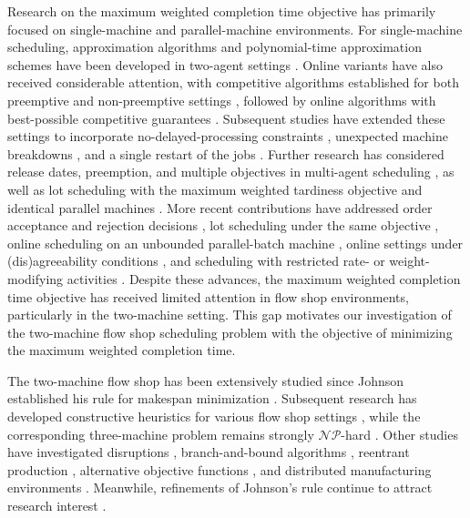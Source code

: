 \documentclass[12pt]{article} \textheight=24.5cm \textwidth=16.5cm \parskip = 0.165cm
\begin{document}
\begin{sloppypar}
        Research on the maximum weighted completion time objective has primarily focused on single-machine and parallel-machine environments.
        For single-machine scheduling, approximation algorithms and polynomial-time approximation schemes have been developed in two-agent settings \citep{NongChengNg2011EJOR}.
        Online variants have also received considerable attention, with competitive algorithms established for both preemptive and non-preemptive settings \citep{Li-Wenjie2015APJOR}, followed by online algorithms with best-possible competitive guarantees \citep{ChaiLuLi2018APJOR}.
        Subsequent studies have extended these settings to incorporate no-delayed-processing constraints \citep{LiLiu2023OptimLett}, unexpected machine breakdowns \citep{GuoChenMao2024APJOR}, and a single restart of the jobs \citep{LiangLuSun2024AIMSMath}.
        Further research has considered release dates, preemption, and multiple objectives in multi-agent scheduling \citep{YuanNgCheng2020EJOR}, as well as lot scheduling with the maximum weighted tardiness objective \citep{MosheiovSarig2023JOCO} and identical parallel machines \citep{Sun2024JOCO}.
        More recent contributions have addressed order acceptance and rejection decisions \citep{LuZuoZhangOu20254OR}, lot scheduling under the same objective \citep{ZhengLiLiu2025JOCO}, online scheduling on an unbounded parallel-batch machine \citep{ZhangLuYuan2025JOCO}, online settings under (dis)agreeability conditions \citep{FanLuShi2026JIMO}, and scheduling with restricted rate- or weight-modifying activities \citep{ZuoZhangShiFan2026DAM,ZuoLuZhang2026IJFCS}.
        Despite these advances, the maximum weighted completion time objective has received limited attention in flow shop environments, particularly in the two-machine setting.
        This gap motivates our investigation of the two-machine flow shop scheduling problem with the objective of minimizing the maximum weighted completion time.
        
        The two-machine flow shop has been extensively studied since Johnson established his rule for makespan minimization \citep{Johnson1954NRL}.
        Subsequent research has developed constructive heuristics for various flow shop settings \citep{ShaoShaoPi2021COR}, while the corresponding three-machine problem remains strongly $\mathcal{NP}$-hard \citep{Pinedo2022scheduling}.
        Other studies have investigated disruptions \citep{HnaienArbaoui2023ANOR}, branch-and-bound algorithms \citep{LiuUrgo2024IJPR}, reentrant production \citep{LiuUrgo2024ANOR}, alternative objective functions \mbox{\citep{ShabtayGerstl2024EJOR}}, and distributed manufacturing environments \citep{BeckerNeufeldBuscher2025EJOR}.
        Meanwhile, refinements of Johnson's rule continue to attract research interest \citep{DellaCroceSchau2026ORL}.
        

\end{sloppypar}
\end{document}
